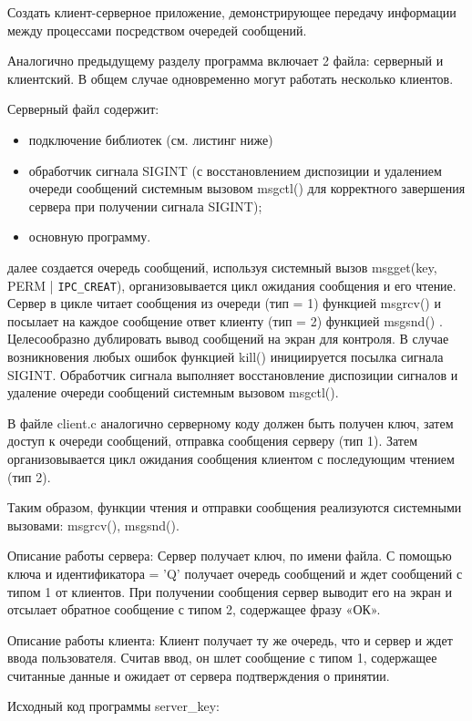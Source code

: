 \documentclass[a4paper]{article}
\begin{document}
	Создать клиент-серверное приложение, демонстрирующее передачу информации между процессами посредством очередей сообщений.

	Аналогично предыдущему разделу программа включает 2 файла: серверный и клиентский. В общем случае одновременно могут работать несколько клиентов.
	
	Серверный файл содержит:
	\begin{itemize}
	\item подключение библиотек (см. листинг ниже)
	\item обработчик сигнала SIGINT (с восстановлением диспозиции и удалением очереди сообщений системным вызовом msgctl() для корректного завершения сервера при получении сигнала SIGINT);
	\item основную программу.
	\end{itemize}
далее создается очередь сообщений, используя системный вызов msgget(key, PERM | \texttt{IPC\_CREAT}), организовывается цикл ожидания сообщения и его чтение. Сервер в цикле читает сообщения из очереди (тип = 1) функцией msgrcv() и посылает на каждое сообщение ответ клиенту (тип = 2) функцией msgsnd() . Целесообразно дублировать вывод сообщений на экран для контроля. В случае возникновения любых ошибок функцией kill() инициируется посылка сигнала SIGINT. Обработчик сигнала выполняет восстановление диспозиции сигналов и удаление очереди сообщений системным вызовом msgctl().

	В файле client.c аналогично серверному коду должен быть получен ключ, затем доступ к очереди сообщений, отправка сообщения серверу (тип 1). Затем организовывается цикл ожидания сообщения клиентом с последующим чтением (тип 2).
	
	Таким образом, функции чтения и отправки сообщения реализуются системными вызовами: msgrcv(), msgsnd().
	
	Описание работы сервера: Сервер получает ключ, по имени файла. С помощью ключа и идентификатора = 'Q' получает очередь сообщений и ждет сообщений с типом 1 от клиентов. При получении сообщения сервер выводит его на экран и отсылает обратное сообщение с типом 2, содержащее фразу «ОК».

	Описание работы клиента: Клиент получает ту же очередь, что и сервер и ждет ввода пользователя. Считав ввод, он шлет сообщение с типом 1, содержащее считанные данные и ожидает от сервера подтверждения о принятии.
	
	Исходный код программы server\_key:
	
\end{document}
